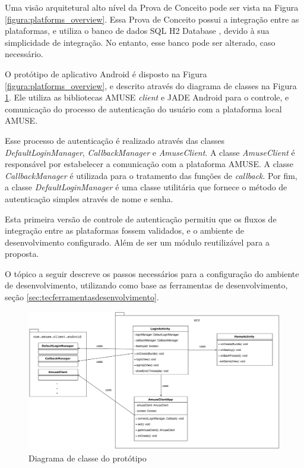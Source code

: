   Uma visão arquitetural alto nível da Prova de Conceito pode ser vista na
  Figura \ref{figura:platforms_overview}. Essa Prova de Conceito possui a
  integração entre as plataformas, e utiliza o banco de dados SQL H2 Database
  \cite{h2db}, devido à sua simplicidade de integração. No entanto, esse banco
  pode ser alterado, caso necessário.

  O protótipo de aplicativo Android é disposto na Figura
  \ref{figura:platforms_overview}, e descrito através do diagrama de classes na
  Figura \ref{figura:class_diagram_prototype}. Ele utiliza as bibliotecas AMUSE
  \textit{client} e JADE Android para o controle, e comunicação do processo de
  autenticação do usuário com a plataforma local AMUSE.

  Esse processo de autenticação é realizado através das classes
  \textit{DefaultLoginManager}, \textit{CallbackManager} e
  \textit{AmuseClient}. A classe \textit{AmuseClient} é responsável por
  estabelecer a comunicação com a plataforma AMUSE. A classe
  \textit{CallbackManager} é utilizada para o tratamento das funções de
  \textit{callback}. Por fim, a classe \textit{DefaultLoginManager} é uma classe
  utilitária que fornece o método de autenticação simples através de nome e
  senha.

  Esta primeira versão de controle de autenticação permitiu que os fluxos de
  integração entre as plataformas fossem validados, e o ambiente de
  desenvolvimento configurado. Além de ser um módulo reutilizável para a
  proposta.

  O tópico a seguir descreve os passos necessários para a configuração do
  ambiente de desenvolvimento, utilizando como base as ferramentas de
  desenvolvimento, seção \ref{sec:tecferramentasdesenvolvimento}.

  \begin{figure}[h]
    \centering
    \includegraphics[width=16cm]{figuras/class_diagram_prototype}
    \caption{Diagrama de classe do protótipo }
    \label{figura:class_diagram_prototype}
  \end{figure}

